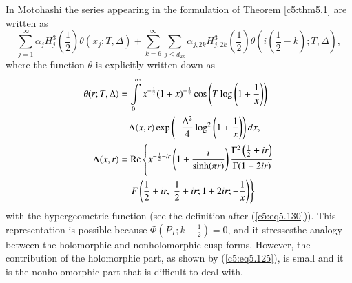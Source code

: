 In Motohashi \cite{Motohashi6} the series appearing in the formulation
of Theorem \ref{c5:thm5.1} are written as   
$$ 
\sum\limits^{\infty}_{j=1} \alpha_j H^3_j \left(\frac{1}{2} \right)
\theta (x_j; T, \Delta) + \sum\limits^\infty_{k=6} \sum\limits_{j \leq
  d_{2k}} \alpha_{j,2k} H^{3}_{j,2k} \left(\frac{1}{2} \right) \theta
\left(i \left(\frac{1}{2} - k \right) ; T,\Delta \right), 
$$
where the function $\theta$ is explicitly written down as 
\begin{align*}
\theta(r;T,\Delta) &  = \int\limits^\infty_0 x^{-\frac{1}{2}}
(1+x)^{-\frac{1}{2}} \cos \left( T \log \left(1+\frac{1}{x} \right)
\right)  \\ 
& \quad \Lambda (x,r) \exp \left( -\frac{\Delta^2}{4} \log^2
\left(1+\frac{1}{x} \right)\right) dx, \\ 
\Lambda (x,r) & = \operatorname{Re} \left\{  x^{-\frac{1}{2} - ir}
\left(1+\frac{i}{\sinh (\pi r)} \right) \frac{\Gamma^2 
\left(\frac{1}{2} +  ir\right)}{\Gamma(1+2ir)} \right.\\ 
& \quad \left.    F \left( \frac{1}{2} + ir, \; \frac{1}{2} + ir; 1+2ir; - \frac{1}{x}\right)\right\}
\end{align*}
with the hypergeometric function (see the definition after
(\ref{c5:eq5.130})). This representation is possible because $\Phi
(P_T; k - \frac{1}{2}) = 0$, and it stresses\pageoriginale the analogy
between the holomorphic and nonholomorphic cusp forms. However, the
contribution of the holomorphic part, as shown by (\ref{c5:eq5.125}),
is small and it is the nonholomorphic part that is difficult to deal
with. 

